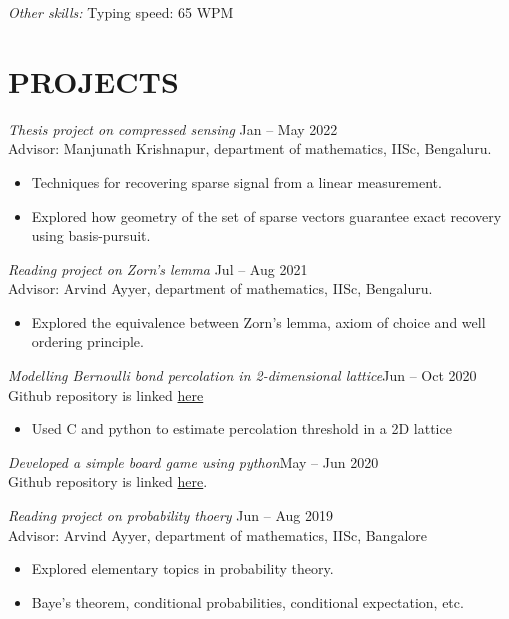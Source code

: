 \documentclass[margin, 10pt]{res} %
\begin{document}
\begin{resume}
{\sl Other skills:} Typing speed: 65 WPM
 
 
\section{PROJECTS}

{\sl Thesis project on compressed sensing} \hfill  Jan -- May 2022\\
Advisor: Manjunath Krishnapur, department of mathematics, IISc, Bengaluru.
\begin{itemize} \itemsep -2pt
\item Techniques for recovering sparse signal from a linear measurement.
\item Explored how geometry of the set of sparse vectors guarantee exact recovery
	using basis-pursuit.
\end{itemize} 
\smallskip

{\sl Reading project on Zorn's lemma} \hfill Jul -- Aug 2021 \\
Advisor: Arvind Ayyer, department of mathematics, IISc, Bengaluru.
\begin{itemize} 
\item Explored the equivalence between Zorn's lemma, axiom of choice and well ordering principle.
\end{itemize} 
\smallskip

{\sl Modelling Bernoulli bond percolation in 2-dimensional lattice}\hfill Jun -- Oct 2020\\
Github repository is linked \href{https://github.com/AbhinavM2000/percolation\_}{here}
\begin{itemize}
	\item Used C and python to estimate percolation threshold in a 2D lattice
\end{itemize}
\smallskip

{\sl Developed a simple board game using python}\hfill May -- Jun 2020\\
Github repository is linked \href{https://github.com/DhanusML/marble-and-hole-puzzle}{here}.
\smallskip

{\sl Reading project on probability thoery} \hfill Jun -- Aug 2019 \\
Advisor: Arvind Ayyer, department of mathematics, IISc, Bangalore
\begin{itemize} \itemsep -2pt %
\item Explored elementary topics in probability theory.
\item Baye's theorem, conditional probabilities, conditional expectation, etc.
\end{itemize}


\end{resume}
\end{document}
